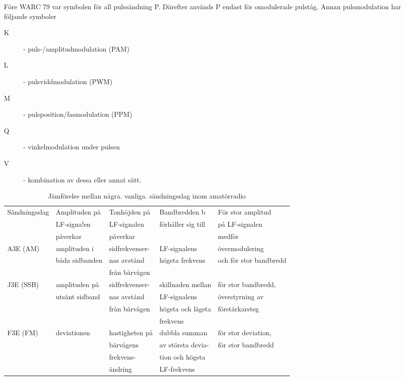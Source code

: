 Före WARC 79 var symbolen för all pulssändning P. Därefter används P endast för
omodulerade pulståg. Annan pulsmodulation har följande symboler

\begin{description}
\item[K] - puls-/amplitudmodulation (PAM)
\item[L] - pulsviddmodulation (PWM)
\item[M] - pulsposition/fasmodulation (PPM)
\item[Q] - vinkelmodulation under pulsen
\item[V] - kombination av dessa eller annat sätt.
\end{description}

\begin{table*}[h]
\begin{center}
\begin{tabular}{|l|l|l|l|l|}
\hline
Sändningsslag & Amplituden på & Tonhöjden på & Bandbredden b      & För stor amplitud \\
              & LF-signa!en   & LF-signalen  & förhåller sig till & på LF-signalen \\
              & påverkar      & påverkar     &                    & medför \\ \hline
A3E (AM) & amplituden i   & sidfrekvenser- & LF-signalens    & övermodulering \\
         & båda sidbanden & nas avstånd    & högsta frekvens & och för stor bandbredd \\
         &                & från bärvågen  & & \\
J3E (SSB)& amplituden på  & sidfrekvenser- & skillnaden mellan & för stor bandbredd,\\
         & utsänt sidband & nas avstånd    & LF-signalens      & överstyrning av\\
         &                & från bärvågen  & högsta och lägsta & förstärkarsteg\\
         &                &                & frekvens          & \\
F3E (FM) & deviationen    & hastigheten på & dubbla summan     & för stor deviation,\\
         &                & bärvågens      & av största devia- & för stor bandbredd\\
         &                & frekvens-      & tion och högsta   & \\
         &                & ändring        & LF-frekvens       & \\ \hline
\end{tabular}
\end{center}
\caption{Jämförelse mellan några. vanliga. sändningsslag inom amatörradio}
\end{table*}

